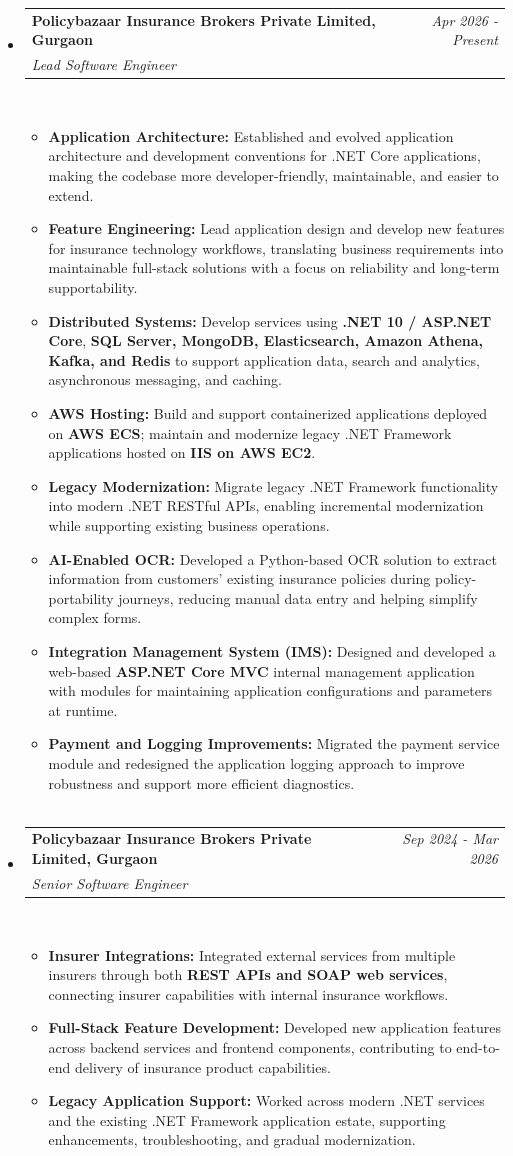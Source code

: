 \documentclass[a4paper,12pt]{article}
\makeatletter
\newcommand{\resumeSubHeadingListStart}{\begin{itemize}[leftmargin=*,labelsep=1mm,noitemsep]}
\newcommand{\resumeSubHeadingListEnd}{\end{itemize}\vspace{2mm}}
\newcommand{\resumeItemListStart}{\begin{itemize}[leftmargin=3ex, rightmargin=2ex, noitemsep,labelsep=1.2mm,itemsep=0mm]\small}
\newcommand{\resumeItemListEnd}{\end{itemize}\vspace{-2mm}}
\newcommand{\resumeExperience}[4]{
\vspace{0.5mm}\item
    \begin{tabular*}{0.98\textwidth}[t]{l@{\extracolsep{\fill}}r}
        \textbf{#1} & \textit{\footnotesize{#3}}\\
        \textit{\footnotesize{#2}} & {}
    \end{tabular*}\\ [1mm]
    \footnotesize{#4}
}
\newcommand{\emptyLine}{\\[-3mm]}
\makeatother
\begin{document}
\resumeSubHeadingListStart
\resumeExperience {Policybazaar Insurance Brokers Private Limited, Gurgaon}
 {Lead Software Engineer} {Apr 2026 - Present}
 {}
\resumeItemListStart
    \item \textbf{Application Architecture:} Established and evolved application architecture and development conventions for .NET Core applications, making the codebase more developer-friendly, maintainable, and easier to extend.
    \item \textbf{Feature Engineering:} Lead application design and develop new features for insurance technology workflows, translating business requirements into maintainable full-stack solutions with a focus on reliability and long-term supportability.
    \item \textbf{Distributed Systems:} Develop services using \textbf{.NET 10 / ASP.NET Core}, \textbf{SQL Server, MongoDB, Elasticsearch, Amazon Athena, Kafka, and Redis} to support application data, search and analytics, asynchronous messaging, and caching.
    \item \textbf{AWS Hosting:} Build and support containerized applications deployed on \textbf{AWS ECS}; maintain and modernize legacy .NET Framework applications hosted on \textbf{IIS on AWS EC2}.
    \item \textbf{Legacy Modernization:} Migrate legacy .NET Framework functionality into modern .NET RESTful APIs, enabling incremental modernization while supporting existing business operations.
    \item \textbf{AI-Enabled OCR:} Developed a Python-based OCR solution to extract information from customers' existing insurance policies during policy-portability journeys, reducing manual data entry and helping simplify complex forms.
    \item \textbf{Integration Management System (IMS):} Designed and developed a web-based \textbf{ASP.NET Core MVC} internal management application with modules for maintaining application configurations and parameters at runtime.
    \item \textbf{Payment and Logging Improvements:} Migrated the payment service module and redesigned the application logging approach to improve robustness and support more efficient diagnostics.
\emptyLine
\emptyLine
\resumeItemListEnd
\resumeExperience {Policybazaar Insurance Brokers Private Limited, Gurgaon}
 {Senior Software Engineer} {Sep 2024 - Mar 2026}
 {}
\resumeItemListStart
    \item \textbf{Insurer Integrations:} Integrated external services from multiple insurers through both \textbf{REST APIs and SOAP web services}, connecting insurer capabilities with internal insurance workflows.
    \item \textbf{Full-Stack Feature Development:} Developed new application features across backend services and frontend components, contributing to end-to-end delivery of insurance product capabilities.
    \item \textbf{Legacy Application Support:} Worked across modern .NET services and the existing .NET Framework application estate, supporting enhancements, troubleshooting, and gradual modernization.
\resumeItemListEnd
\resumeSubHeadingListEnd
\end{document}
